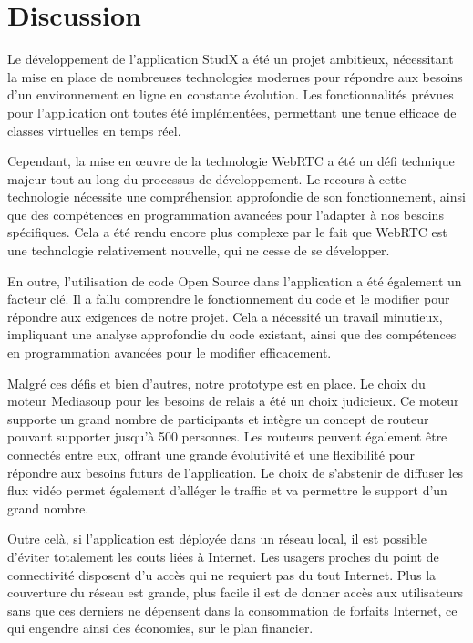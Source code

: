 \section{Discussion}
Le développement de l'application StudX a été un projet ambitieux, 
nécessitant la mise en place de nombreuses technologies modernes pour 
répondre aux besoins d'un environnement en ligne en constante évolution. 
Les fonctionnalités prévues pour l'application ont toutes été implémentées, 
permettant une tenue efficace de classes virtuelles en temps réel.


Cependant, la mise en œuvre de la technologie WebRTC a été un défi technique majeur 
tout au long du processus de développement. Le recours à cette technologie nécessite
une compréhension approfondie de son fonctionnement, ainsi que des compétences en 
programmation avancées pour l'adapter à nos besoins spécifiques. Cela a été rendu 
encore plus complexe par le fait que WebRTC est une technologie relativement nouvelle, 
qui ne cesse de se développer.


En outre, l'utilisation de code Open Source dans l'application a été également un facteur clé. 
Il a fallu comprendre le fonctionnement du code et le modifier pour répondre aux exigences de notre projet. 
Cela a nécessité un travail minutieux, impliquant une analyse approfondie du code existant, ainsi 
que des compétences en programmation avancées pour le modifier efficacement.

Malgré ces défis et bien d'autres, notre prototype est en place. Le choix du moteur Mediasoup pour les besoins de relais a été un choix judicieux. 
Ce moteur supporte un grand nombre de participants et intègre un concept de routeur pouvant supporter jusqu'à 500 personnes. 
Les routeurs peuvent également être connectés entre eux, offrant une grande évolutivité et une flexibilité pour répondre aux besoins futurs de l'application.
Le choix de s'abstenir de diffuser les flux vidéo permet également d'alléger le traffic et va permettre le support d'un grand nombre.

Outre celà, si l'application est déployée dans un réseau local, il est possible d'éviter totalement les couts liées à Internet.
Les usagers proches du point de connectivité disposent d'u accès qui ne requiert pas du tout Internet. Plus la couverture du réseau est grande, plus facile
il est de donner accès aux utilisateurs sans que ces derniers ne dépensent dans la consommation
de forfaits Internet, ce qui engendre ainsi des économies, sur le plan financier. 

